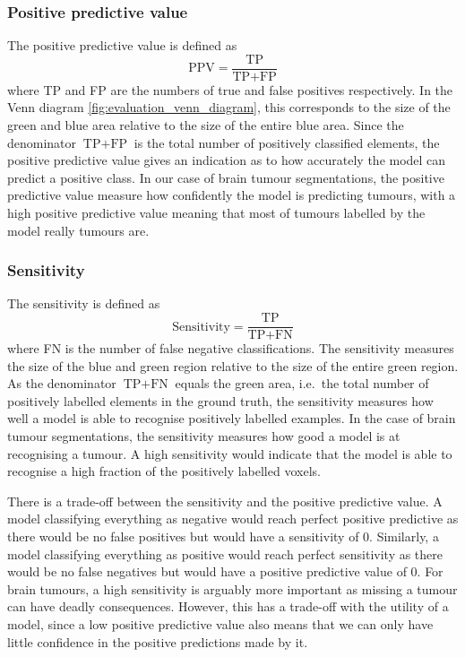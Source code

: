 \documentclass[12pt,a4paper,twoside,openright]{report}
\begin{document}
\subsubsection{Positive predictive value}
The positive predictive value is defined as
\begin{equation}
	\textrm{PPV} = \frac{\textrm{TP}}{\textrm{TP} + \textrm{FP}}
\end{equation}
where \textrm{TP} and \textrm{FP} are the numbers of true and false positives respectively. In the Venn diagram \ref{fig:evaluation_venn_diagram}, this corresponds to the size of the green and blue area relative to the size of the entire blue area.  Since the denominator $\textrm{TP} + \textrm{FP}$ is the total number of positively classified elements, the positive predictive value gives an indication as to how accurately the model can predict a positive class. In our case of brain tumour segmentations, the positive predictive value measure how confidently the model is predicting tumours, with a high positive predictive value meaning that most of tumours labelled by the model really tumours are.
\subsubsection{Sensitivity}
The sensitivity is defined as 
\begin{equation}
	\textrm{Sensitivity} = \frac{\textrm{TP}}{\textrm{TP} + \textrm{FN}}
\end{equation}
where \textrm{FN} is the number of false negative classifications. The sensitivity measures the size of the blue and green region relative to the size of the entire green region. As the denominator $\textrm{TP} + \textrm{FN}$ equals the green area, i.e.\ the total number of positively labelled elements in the ground truth, the sensitivity measures how well a model is able to recognise positively labelled examples. In the case of brain tumour segmentations, the sensitivity measures how good a model is at recognising a tumour. A high sensitivity would indicate that the model is able to recognise a high fraction of the positively labelled voxels.

There is a trade-off between the sensitivity and the positive predictive value. A model classifying everything as negative would reach perfect positive predictive as there would be no false positives but would have a sensitivity of 0. Similarly, a model classifying everything as positive would reach perfect sensitivity as there would be no false negatives but would have a positive predictive value of 0. For brain tumours, a high sensitivity is arguably more important as missing a tumour can have deadly consequences. However, this has a trade-off with the utility of a model, since a low positive predictive value also means that we can only have little confidence in the positive predictions made by it.
\end{document}
